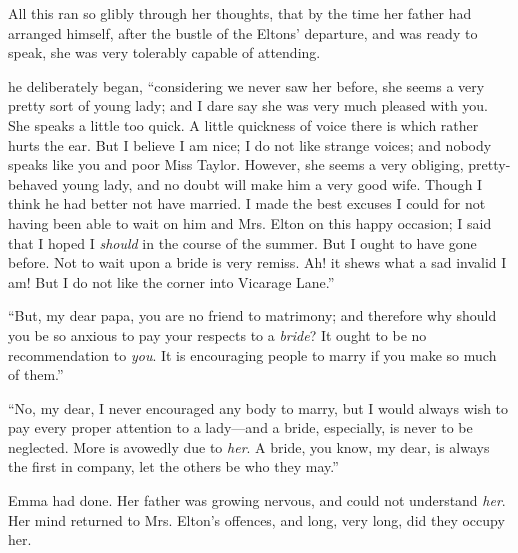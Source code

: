 All this ran so glibly through her thoughts, that by the time her father had arranged himself, after the bustle of the Eltons' departure, and was ready to speak, she was very tolerably capable of attending.

 he deliberately began, “considering we never saw her before, she seems a very pretty sort of young lady; and I dare say she was very much pleased with you. She speaks a little too quick. A little quickness of voice there is which rather hurts the ear. But I believe I am nice; I do not like strange voices; and nobody speaks like you and poor Miss Taylor. However, she seems a very obliging, pretty-behaved young lady, and no doubt will make him a very good wife. Though I think he had better not have married. I made the best excuses I could for not having been able to wait on him and Mrs. Elton on this happy occasion; I said that I hoped I {\em should} in the course of the summer. But I ought to have gone before. Not to wait upon a bride is very remiss. Ah! it shews what a sad invalid I am! But I do not like the corner into Vicarage Lane.”



“But, my dear papa, you are no friend to matrimony; and therefore why should you be so anxious to pay your respects to a {\em bride}? It ought to be no recommendation to {\em you}. It is encouraging people to marry if you make so much of them.”

“No, my dear, I never encouraged any body to marry, but I would always wish to pay every proper attention to a lady---and a bride, especially, is never to be neglected. More is avowedly due to {\em her}. A bride, you know, my dear, is always the first in company, let the others be who they may.”



Emma had done. Her father was growing nervous, and could not understand {\em her}. Her mind returned to Mrs. Elton's offences, and long, very long, did they occupy her.

